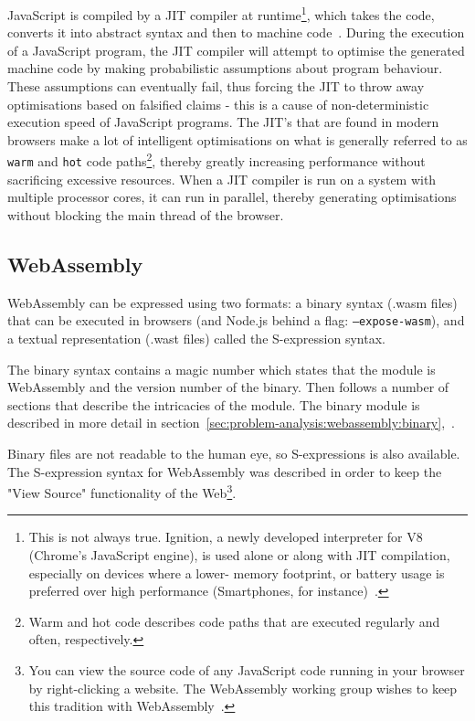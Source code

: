 \documentclass[a4paper]{article}
\begin{document}
JavaScript is compiled by a JIT compiler at runtime\footnote{This is not always true. Ignition, a newly developed interpreter for V8 (Chrome's JavaScript engine), is used alone or along with JIT compilation, especially on devices where a lower- memory footprint, or battery usage is preferred over high performance (Smartphones, for instance)~\cite{video:thompson-js-perf-v8-and-wasm}.}, which takes the code, converts it into abstract syntax and then to machine code~\cite[p.~13]{slides:lund-v8}. During the execution of a JavaScript program, the JIT compiler will attempt to optimise the generated machine code by making probabilistic assumptions about program behaviour. These assumptions can eventually fail, thus forcing the JIT to throw away optimisations based on falsified claims - this is a cause of non-deterministic execution speed of JavaScript programs. The JIT's that are found in modern browsers make a lot of intelligent optimisations on what is generally referred to as \texttt{warm} and \texttt{hot} code paths\footnote{Warm and hot code describes code paths that are executed regularly and often, respectively.}, thereby greatly increasing performance without sacrificing excessive resources. When a JIT compiler is run on a system with multiple processor cores, it can run in parallel, thereby generating optimisations without blocking the main thread of the browser.

\subsection{WebAssembly}
\label{sec:problem-analysis:webassembly}
WebAssembly can be expressed using two formats: a binary syntax (.wasm files) that can be executed in browsers (and Node.js behind a flag: \texttt{--expose-wasm}), and a textual representation (.wast files) called the S-expression syntax.

The binary syntax contains a magic number which states that the module is WebAssembly and the version number of the binary. Then follows a number of sections that describe the intricacies of the module. The binary module is described in more detail in section~\ref{sec:problem-analysis:webassembly:binary},~.

Binary files are not readable to the human eye, so S-expressions is also available. The S-expression syntax for WebAssembly was described in order to keep the "View Source" functionality of the Web\footnote{You can view the source code of any JavaScript code running in your browser by right-clicking a website. The WebAssembly working group wishes to keep this tradition with WebAssembly~\cite{website:wasm-webassembly-high-level-goals}.}.
\end{document}
